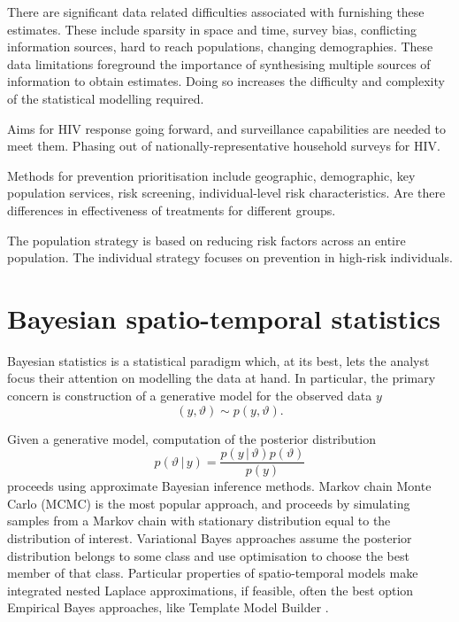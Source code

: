 \documentclass[a4paper, nobind]{templates/ociamthesis}
\begin{document}
There are significant data related difficulties associated with furnishing these estimates.
These include sparsity in space and time, survey bias, conflicting information sources, hard to reach populations, changing demographies.
These data limitations foreground the importance of synthesising multiple sources of information to obtain estimates.
Doing so increases the difficulty and complexity of the statistical modelling required.

Aims for HIV response going forward, and surveillance capabilities are needed to meet them.
Phasing out of nationally-representative household surveys for HIV.

Methods for prevention prioritisation include geographic, demographic, key population services, risk screening, individual-level risk characteristics.
Are there differences in effectiveness of treatments for different groups.

The population strategy \autocite{rose2001sick} is based on reducing risk factors across an entire population.
The individual strategy focuses on prevention in high-risk individuals.

\hypertarget{bayesian-spatio-temporal-statistics}{%
\section{Bayesian spatio-temporal statistics}\label{bayesian-spatio-temporal-statistics}}

Bayesian statistics is a statistical paradigm which, at its best, lets the analyst focus their attention on modelling the data at hand.
In particular, the primary concern is construction of a generative model for the observed data \(y\)
\[
(y, \vartheta) \sim p(y, \vartheta).
\]

Given a generative model, computation of the posterior distribution
\[
p(\vartheta \, | \, y) = \frac{p(y \, | \, \vartheta) p(\vartheta)}{p(y)}
\]
proceeds using approximate Bayesian inference methods.
Markov chain Monte Carlo (MCMC) is the most popular approach, and proceeds by simulating samples from a Markov chain with stationary distribution equal to the distribution of interest.
Variational Bayes approaches assume the posterior distribution belongs to some class and use optimisation to choose the best member of that class.
Particular properties of spatio-temporal models make integrated nested Laplace approximations, if feasible, often the best option
Empirical Bayes approaches, like Template Model Builder \autocite{osgoodzimmerman2021statistical}.
\end{document}

